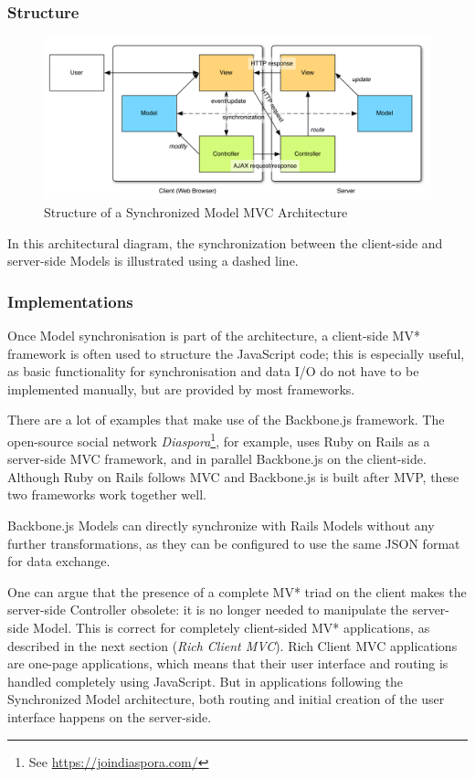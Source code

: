 \subsubsection{Structure}
\begin{figure}[H]
	\centering
	\includegraphics[width=16cm]{images/syncmodelmvc.pdf}
	\caption{Structure of a Synchronized Model MVC Architecture}
	\label{fig:syncmodel}
\end{figure}

In this architectural diagram, the synchronization between the client-side and server-side Models is illustrated using a dashed line.

\subsubsection{Implementations}
Once Model synchronisation is part of the architecture, a client-side MV* framework is often used to structure the JavaScript code; this is especially useful, as basic functionality for synchronisation and data I/O do not have to be implemented manually, but are provided by most frameworks.

There are a lot of examples that make use of the Backbone.js framework. The open-source social network \emph{Diaspora}\footnote{See \url{https://joindiaspora.com/}}, for example, uses Ruby on Rails as a server-side MVC framework, and in parallel Backbone.js on the client-side. Although Ruby on Rails follows MVC and Backbone.js is built after MVP, these two frameworks work together well.

Backbone.js Models can directly synchronize with Rails Models without any further transformations, as they can be configured to use the same JSON format for data exchange.

One can argue that the presence of a complete MV* triad on the client makes the server-side Controller obsolete: it is no longer needed to manipulate the server-side Model. This is correct for completely client-sided MV* applications, as described in the next section (\emph{Rich Client MVC}). Rich Client MVC applications are one-page applications, which means that their user interface and routing is handled completely using JavaScript. But in applications following the Synchronized Model architecture, both routing and initial creation of the user interface happens on the server-side.

